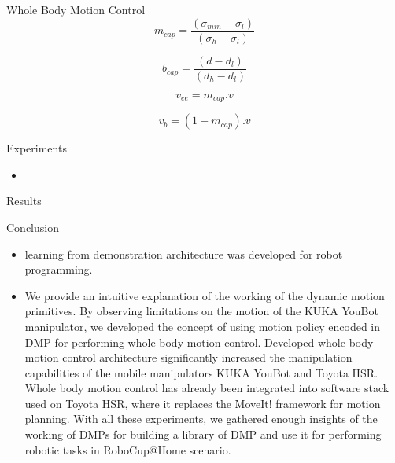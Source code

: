 \documentclass{beamer}
\begin{document}
	\begin{frame}{Whole Body Motion Control}
		\begin{equation}
		m_{cap} = \frac{(\sigma_{min} - \sigma_{l})}{(\sigma_{h} - \sigma_{l})}
		\end{equation}

		\begin{equation}
		b_{cap} = \frac{(d - d_{l})}{(d_{h} - d_{l})}
		\end{equation}
		
		\begin{equation}
		v_{ee} = m_{cap}.v
		\end{equation} 
		
		\begin{equation}
		v_{b} = (1 - m_{cap}).v
		\end{equation} 

	\end{frame}
	
	\begin{frame}{Experiments}
		\begin{itemize}
			\item 
		\end{itemize}
	\end{frame}
	
	\begin{frame}{Results}
	
	\end{frame}
	
	\begin{frame}{Conclusion}
	\begin{itemize}
		\item learning from demonstration architecture was developed for robot programming.

		\item We provide an intuitive explanation of the working of the dynamic motion primitives. By observing limitations on the motion of the KUKA YouBot manipulator, we developed the concept of using motion policy encoded in DMP for performing whole body motion control. Developed whole body motion control architecture significantly increased the manipulation capabilities of the mobile manipulators KUKA YouBot and Toyota HSR. Whole body motion control has already been integrated into software stack used on Toyota HSR, where it replaces the MoveIt! framework for motion planning. With all these experiments, we gathered enough insights of the working of DMPs for building a library of DMP and use it for performing robotic tasks in RoboCup@Home scenario.
	  	\end{itemize}
	\end{frame}
\end{document}
